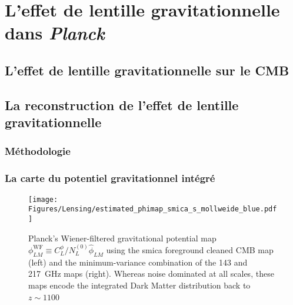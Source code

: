 \documentclass[a4paper, 12pt]{report}
\begin{document}
\part{L'effet de lentille gravitationnelle dans \emph{Planck}}

%
%   
%
\chapter{L'effet de lentille gravitationnelle sur le CMB}
{\color{vert}\lipsum[1-2]}
%
%   
%
\chapter{La reconstruction de l'effet de lentille gravitationnelle}

\section{Méthodologie}
{\color{vert}\lipsum[1-2]}
        
\section{La carte du potentiel gravitationnel intégré}
{\color{vert}\lipsum[1-2]}
        
\begin{figure}
  \centering
  \texttt{[image: Figures/Lensing/estimated\_phimap\_smica\_s\_mollweide\_blue.pdf]}
  \caption[]{Planck's Wiener-filtered gravitational potential map $\phi^{\mathrm{WF}}_{LM} \equiv C_L^{\phi}/N_L^{(0)} \hat{\phi}_{LM}$ using the {\sc smica} foreground cleaned CMB map (left) and the minimum-variance combination of the 143 and 217~GHz maps (right). Whereas noise dominated at all scales, these maps encode the integrated Dark Matter distribution back to $z\sim1100$~\cite{planck2013:lensing}}
  \label{fig:maps}
\end{figure}
\end{document}

